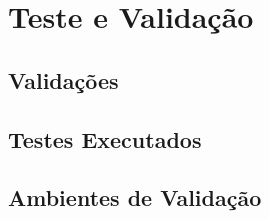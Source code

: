 \chapter{Teste e Validação}

\section{Validações}
\section{Testes Executados}
\section{Ambientes de Validação}